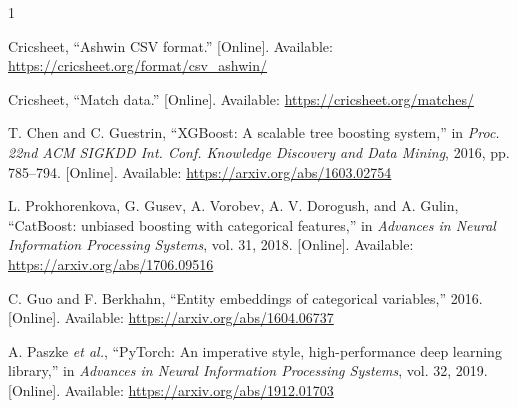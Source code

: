 \documentclass[conference]{IEEEtran}
\begin{document}
\begin{thebibliography}{1}

Cricsheet, ``Ashwin CSV format.'' [Online]. Available: \url{https://cricsheet.org/format/csv_ashwin/}

Cricsheet, ``Match data.'' [Online]. Available: \url{https://cricsheet.org/matches/}

T. Chen and C. Guestrin, ``XGBoost: A scalable tree boosting system,'' in \emph{Proc. 22nd ACM SIGKDD Int. Conf. Knowledge Discovery and Data Mining}, 2016, pp. 785--794. [Online]. Available: \url{https://arxiv.org/abs/1603.02754}

L. Prokhorenkova, G. Gusev, A. Vorobev, A. V. Dorogush, and A. Gulin, ``CatBoost: unbiased boosting with categorical features,'' in \emph{Advances in Neural Information Processing Systems}, vol. 31, 2018. [Online]. Available: \url{https://arxiv.org/abs/1706.09516}

C. Guo and F. Berkhahn, ``Entity embeddings of categorical variables,'' 2016. [Online]. Available: \url{https://arxiv.org/abs/1604.06737}

A. Paszke \emph{et al.}, ``PyTorch: An imperative style, high-performance deep learning library,'' in \emph{Advances in Neural Information Processing Systems}, vol. 32, 2019. [Online]. Available: \url{https://arxiv.org/abs/1912.01703}

\end{thebibliography}
\end{document}
